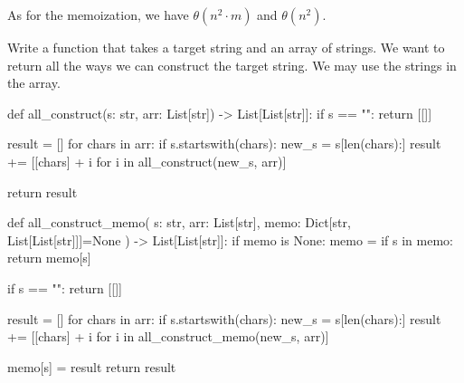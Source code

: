 \documentclass[12pt,dvipsnames,svgnames,x11names]{article}
\begin{document}
As for the memoization, we have \(\theta(n^2\cdot m)\) and \(\theta(n^2)\).
\par\medskip
Write a function that takes a target string and an array of strings. We want to return all the ways we can
construct the target string. We may use the strings in the array.
\begin{python}
def all_construct(s: str, arr: List[str]) -> List[List[str]]:
  if s == "":
    return [[]]
    
  result = []
  for chars in arr:
    if s.startswith(chars):
        new_s = s[len(chars):]
        result += [[chars] + i for i in all_construct(new_s, arr)]
            
  return result
    
    
def all_construct_memo(
    s: str, 
    arr: List[str], 
    memo: Dict[str, List[List[str]]]=None
    ) -> List[List[str]]:
  if memo is None:
    memo = {}
  if s in memo:
    return memo[s]
    
  if s == "":
    return [[]]
    
  result = []
  for chars in arr:
    if s.startswith(chars):
      new_s = s[len(chars):]
      result += [[chars] + i for i in all_construct_memo(new_s, arr)]
    
  memo[s] = result
  return result
\end{python}
\end{document}
